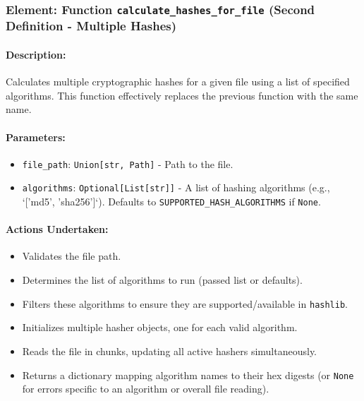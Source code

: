 \documentclass{article}
\begin{document}
\subsubsection{Element: Function \texttt{calculate\_hashes\_for\_file} (Second Definition - Multiple Hashes)}
\paragraph{Description:} Calculates multiple cryptographic hashes for a given file using a list of specified algorithms. This function effectively replaces the previous function with the same name.
\paragraph{Parameters:}
\begin{itemize}
    \item \texttt{file\_path}: \texttt{Union[str, Path]} - Path to the file.
    \item \texttt{algorithms}: \texttt{Optional[List[str]]} - A list of hashing algorithms (e.g., `['md5', 'sha256']`). Defaults to \texttt{SUPPORTED\_HASH\_ALGORITHMS} if \texttt{None}.
\end{itemize}
\paragraph{Actions Undertaken:}
\begin{itemize}
    \item Validates the file path.
    \item Determines the list of algorithms to run (passed list or defaults).
    \item Filters these algorithms to ensure they are supported/available in \texttt{hashlib}.
    \item Initializes multiple hasher objects, one for each valid algorithm.
    \item Reads the file in chunks, updating all active hashers simultaneously.
    \item Returns a dictionary mapping algorithm names to their hex digests (or \texttt{None} for errors specific to an algorithm or overall file reading).
\end{itemize}
\end{document}
